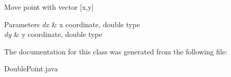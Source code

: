 Move point with vector \mbox{[}x,y\mbox{]} 
\begin{DoxyParams}{Parameters}
{\em dx} & x coordinate, double type \\
\hline
{\em dy} & y coordinate, double type \\
\hline
\end{DoxyParams}


The documentation for this class was generated from the following file\+:\begin{DoxyCompactItemize}
\item 
Double\+Point.\+java\end{DoxyCompactItemize}
